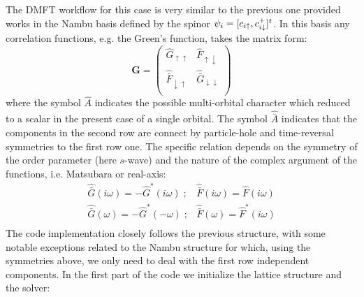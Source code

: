\documentclass[edipack2.tex]{subfiles}
\begin{document}
The DMFT workflow for this case is very similar to the previous one
provided works in the Nambu basis defined by the spinor
$\psi_i=[c_{i\uparrow}, c^+_{i\downarrow}]^t$.
In this basis any correlation functions, e.g. the Green's function, takes the matrix form:
\begin{equation}
  {\mathbf G} =
  \begin{pmatrix}
    \hat{G}_{\uparrow\uparrow} & \hat{F}_{\uparrow\downarrow}\\
    \hat{\bar{F}}_{\downarrow\uparrow}  &    \hat{\bar{G}}_{\downarrow\downarrow} \\
   \end{pmatrix}
\end{equation}
where the symbol $\hat{A}$ indicates the possible multi-orbital
character which reduced to a scalar in the present case of a single
orbital. The symbol $\hat{\bar{A}}$ indicates that the components in
the second row are connect by particle-hole and time-reversal
symmetries to the first row one. The specific relation depends on the
symmetry of the order parameter (here $s$-wave) and the nature of the
complex argument of the functions, i.e. Matsubara or real-axis:
\begin{equation}
\begin{array}{cc}
  \hat{\bar{G}}(i\omega) = -\hat{G}^*(i\omega)\;; &  \hat{\bar{F}}(i\omega) = \hat{F}(i\omega)\\
  \hat{\bar{G}}(\omega)  = -\hat{G}^*(-\omega) \;; & \hat{\bar{F}}(\omega) = \hat{F}^*(i\omega)\\
\end{array}
\end{equation}  
The code implementation closely follows the previous structure, with
some notable exceptions related to the Nambu structure for which,
using the symmetries above, we only need to deal with the first row
independent components. In the first part of the code we initialize
the lattice structure and the solver:
\end{document}
